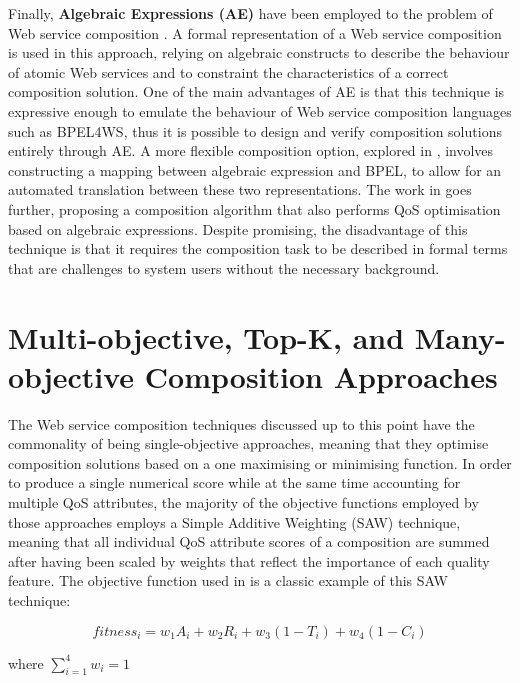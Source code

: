 Finally, \textbf{Algebraic Expressions (AE)} have been employed to the problem of Web service composition \cite{ferrara2004web, kattepur2013qos}. A formal representation of a Web service composition is used in this approach, relying on algebraic constructs to describe the behaviour of atomic Web services and to constraint the characteristics of a correct composition solution. One of the main advantages of AE is that this technique is expressive enough to emulate the behaviour of Web service composition languages such as BPEL4WS, thus it is possible to design and verify composition solutions entirely through AE. A more flexible composition option, explored in \cite{ferrara2004web}, involves constructing a mapping between algebraic expression and BPEL, to allow for an automated translation between these two representations. The work in \cite{kattepur2013qos} goes further, proposing a composition algorithm that also performs QoS optimisation based on algebraic expressions. Despite promising, the disadvantage of this technique is that it requires the composition task to be described in formal terms that are challenges to system users without the necessary background.

\section{Multi-objective, Top-K, and Many-objective Composition Approaches}

The Web service composition techniques discussed up to this point have the commonality of being single-objective approaches, meaning that they optimise composition solutions based on a one maximising or minimising function. In order to produce a single numerical score while at the same time accounting for multiple QoS attributes, the majority of the objective functions employed by those approaches employs a Simple Additive Weighting (SAW) \cite{hwang1981lecture} technique, meaning that all individual QoS attribute scores of a composition are summed after having been scaled by weights that reflect the importance of each quality feature. The objective function used in \cite{da2014graph} is a classic example of this SAW technique:

\begin{equation}
fitness_i = w_1A_i + w_2R_i + w_3(1 - T_i) + w_4(1 - C_i)
\end{equation}

\centerline{where $\sum_{i=1}^{4} w_i = 1$}
\vspace{0.7cm}

